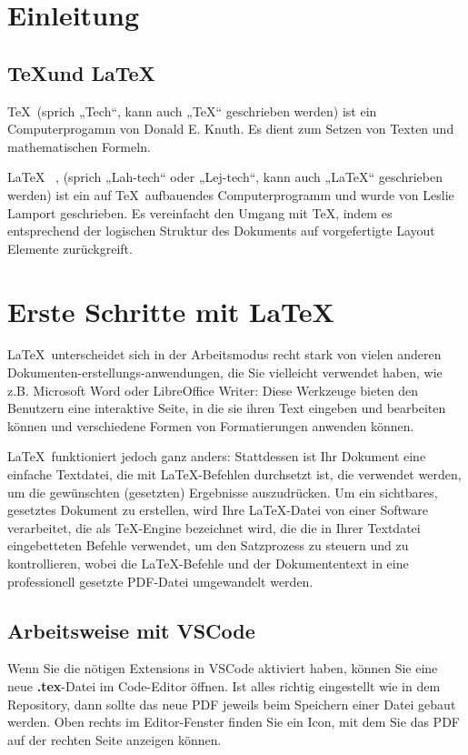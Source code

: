 \section{Einleitung} %
\subsection{\TeX und \LaTeX} %

\TeX\, %
 (sprich „Tech“, kann auch „TeX“ geschrieben werden) ist ein Computerprogamm von Donald E. Knuth.
Es dient zum Setzen von Texten und mathematischen Formeln.
\vspace{2mm} %


\LaTeX\ %
, (sprich „Lah-tech“ oder „Lej-tech“, kann auch „LaTeX“ geschrieben werden) ist ein auf \TeX\, aufbauendes Computerprogramm und wurde von Leslie Lamport geschrieben. Es vereinfacht den Umgang mit  \TeX, indem es entsprechend der logischen Struktur des Dokuments auf vorgefertigte Layout Elemente zurückgreift.

\newpage
\section{Erste Schritte mit \LaTeX}
\LaTeX\, unterscheidet sich in der Arbeitsmodus recht stark von vielen anderen Dokumenten-erstellungs-anwendungen, die Sie vielleicht verwendet haben, wie z.B. Microsoft Word oder LibreOffice Writer: Diese Werkzeuge bieten den Benutzern eine interaktive Seite, in die sie ihren Text eingeben und bearbeiten können und verschiedene Formen von Formatierungen anwenden können.

\LaTeX\, funktioniert jedoch ganz anders: Stattdessen ist Ihr Dokument eine einfache Textdatei, die mit \LaTeX-Befehlen durchsetzt ist, die verwendet werden, um die gewünschten (gesetzten) Ergebnisse auszudrücken. Um ein sichtbares, gesetztes Dokument zu erstellen, wird Ihre \LaTeX-Datei von einer Software verarbeitet, die als \TeX-Engine bezeichnet wird, die die in Ihrer Textdatei eingebetteten Befehle verwendet, um den Satzprozess zu steuern und zu kontrollieren, wobei die \LaTeX-Befehle und der Dokumententext in eine professionell gesetzte PDF-Datei umgewandelt werden.

\subsection{Arbeitsweise mit VSCode}
Wenn Sie die nötigen Extensions in VSCode aktiviert haben, können Sie eine neue \textbf{.tex}-Datei im Code-Editor öffnen. Ist alles richtig eingestellt wie in dem Repository, dann sollte das neue PDF jeweils beim Speichern einer Datei gebaut werden. Oben rechts im Editor-Fenster finden Sie ein Icon, mit dem Sie das PDF auf der rechten Seite anzeigen können.

